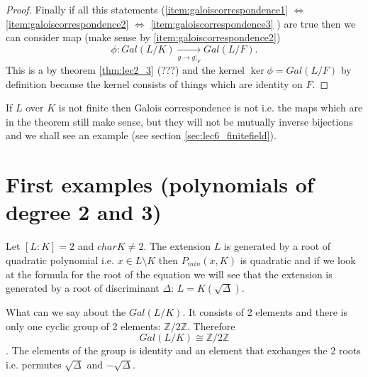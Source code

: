 \begin{theorem}
\begin{proof}
    Finally if all this statements
    (\ref{item:galoiscorrespondence1}
    $\Longleftrightarrow$
    \ref{item:galoiscorrespondence2}
    $\Longleftrightarrow$
    \ref{item:galoiscorrespondence3}
    ) are true then we can consider map (make sense by
    \ref{item:galoiscorrespondence2}) 
    \[
    \phi: Gal\left(L/K\right)
    \xrightarrow[g \to \left.g\right|_F]{}
    Gal\left(L/F\right).
    \]
    This is a  by theorem \ref{thm:lec2_3}
    (???) and the kernel $\ker \phi = Gal\left(L/F\right)$ by
    definition because the kernel consists of things which are identity on $F$. 
  \end{proof}
  \label{thm:galoiscorrespondence}
\end{theorem}

\begin{remark}
  If $L$ over $K$ is not finite then Galois correspondence is not
   i.e. the maps which are in the theorem still
  make sense, but they will not be mutually inverse bijections and we
  shall see an example (see section \ref{sec:lec6_finitefield}).
  \label{rem:lec6_gcnotbijection}
\end{remark}

\section{First examples (polynomials of degree 2 and 3)}

\begin{example}[Degree 2]
  Let $\left[L:K\right] = 2$ and $char K \ne 2$. The extension $L$ is
  generated by a root of 
  quadratic polynomial i.e. $x \in L \setminus K$ then
  $P_{min}\left(x, K\right)$ is quadratic and if we look at the
  formula for the root of the equation we will see that the extension
  is generated by a root of discriminant $\Delta$:
  $L = K\left(\sqrt{\Delta}\right)$.

  What can we say about the $Gal\left(L/K\right)$. It consists of 2
  elements and there is only one cyclic group of 2 elements:
  $\mathbb{Z}/2\mathbb{Z}$. Therefore
  \[
  Gal\left(L/K\right) \cong \mathbb{Z}/2\mathbb{Z}
  \].
  The elements of the group is identity and an element that exchanges
  the 2 roots i.e. permutes $\sqrt{\Delta}$ and $-\sqrt{\Delta}$.
\end{example}


